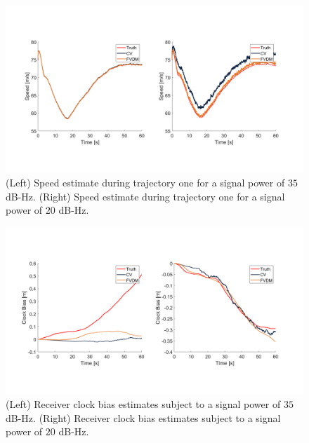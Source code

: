 \begin{figure}[!ht]
    \centering
    \includegraphics[width=\linewidth]{Figures/resultsv2/Slide2.PNG}
    \caption{(Left) Speed estimate during trajectory one for a signal power of \(35\) dB-Hz. (Right) Speed estimate during trajectory one for a signal power of \(20\) dB-Hz.}\label{fig:positionerror221}
\end{figure}

\begin{figure}[!ht]
    \centering
    \includegraphics[width=\linewidth]{Figures/resultsv2/Slide3.PNG}
    \caption{(Left) Receiver clock bias estimates subject to a signal power of \(35\) dB-Hz. (Right) Receiver clock bias estimates subject to a signal power of \(20\) dB-Hz.}\label{fig:velocityerror451}
\end{figure}




